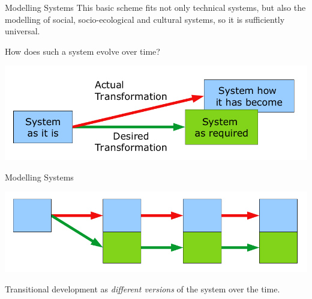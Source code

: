 \documentclass{beamer}
\begin{document}
\begin{frame}{Modelling Systems}
  This basic scheme fits not only technical systems, but also the modelling of
  social, socio-ecological and cultural systems, so it is sufficiently
  universal.

How does such a system evolve over time?
\begin{center}
  \includegraphics[width=.9\textwidth]{SD-2.png}
\end{center}
\end{frame}

\begin{frame}{Modelling Systems}
\begin{center}
  \includegraphics[width=.9\textwidth]{SD-3.png}
\end{center}
Transitional development as \emph{different versions} of the system over the
time.
\end{frame}
\end{document}

